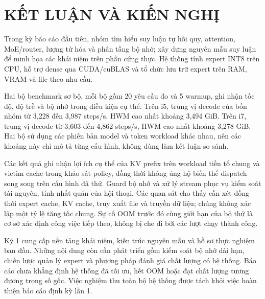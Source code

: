\chapter*{KẾT LUẬN VÀ KIẾN NGHỊ}


Trong kỳ báo cáo đầu tiên, nhóm tìm hiểu suy luận tự hồi quy, attention, MoE/router, lượng tử hóa và phân tầng bộ nhớ; xây dựng nguyên mẫu suy luận để minh họa các khái niệm trên phần cứng thực. Hệ thống tính expert INT8 trên CPU, hỗ trợ dense qua CUDA/cuBLAS và tổ chức lưu trữ expert trên RAM, VRAM và file theo nhu cầu.

Hai bộ benchmark sơ bộ, mỗi bộ gồm 20 yêu cầu đo và 5 warmup, ghi nhận tốc độ, độ trễ và bộ nhớ trong điều kiện cụ thể. Trên i5, trung vị decode của bốn nhóm từ 3,228 đến 3,987 steps/s, HWM cao nhất khoảng 3,494 GiB. Trên i7, trung vị decode từ 3,603 đến 4,862 steps/s, HWM cao nhất khoảng 3,278 GiB. Hai bộ sử dụng các phiên bản model và token workload khác nhau, nên các khoảng này chỉ mô tả từng cấu hình, không dùng làm kết luận so sánh.

Các kết quả ghi nhận lợi ích cụ thể của KV prefix trên workload tiền tố chung và victim cache trong khảo sát policy, đồng thời không ủng hộ biến thể dispatch song song trên cấu hình đã thử. Guard bộ nhớ và xử lý stream phục vụ kiểm soát tài nguyên, tính nhất quán của hội thoại. Các quan sát cho thấy cần xét đồng thời expert cache, KV cache, truy xuất file và truyền dữ liệu; chúng không xác lập một tỷ lệ tăng tốc chung. Sự cố OOM trước đó cùng giới hạn của bộ thử là cơ sở xác định công việc tiếp theo, không bị che đi bởi các lượt chạy thành công.

Kỳ 1 cung cấp nền tảng khái niệm, kiến trúc nguyên mẫu và hồ sơ thực nghiệm ban đầu. Những nội dung còn cần phát triển gồm kiểm soát bộ nhớ dài hạn, chiến lược quản lý expert và phương pháp đánh giá chất lượng có hệ thống. Báo cáo chưa khẳng định hệ thống đã tối ưu, hết OOM hoặc đạt chất lượng tương đương trọng số gốc. Việc nghiệm thu toàn bộ hệ thống được tách khỏi việc hoàn thiện báo cáo định kỳ lần 1.